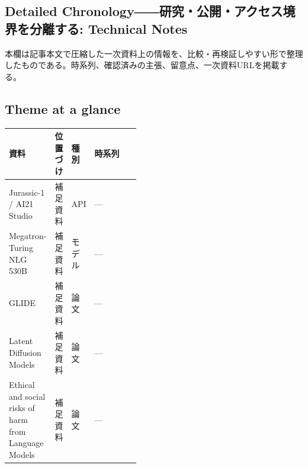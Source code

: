 \subsection*{Detailed Chronology――研究・公開・アクセス境界を分離する: Technical Notes}
本欄は記事本文で圧縮した一次資料上の情報を、比較・再検証しやすい形で整理したものである。時系列、確認済みの主張、留意点、一次資料URLを掲載する。
\smallskip
{}\par
\medskip
\subsection*{Theme at a glance}
\begin{center}
\footnotesize
\begin{tabularx}{\linewidth}{@{}p{0.20\linewidth}p{0.10\linewidth}p{0.14\linewidth}X@{}}
\toprule
資料 & 位置づけ & 種別 & 時系列 \\
\midrule
Jurassic-1 / AI21 Studio & 補足資料 & API & — \\
Megatron-Turing NLG 530B & 補足資料 & モデル & — \\
GLIDE & 補足資料 & 論文 & — \\
Latent Diffusion Models & 補足資料 & 論文 & — \\
Ethical and social risks of harm from Language Models & 補足資料 & 論文 & — \\
\bottomrule
\end{tabularx}
\end{center}
\normalsize

